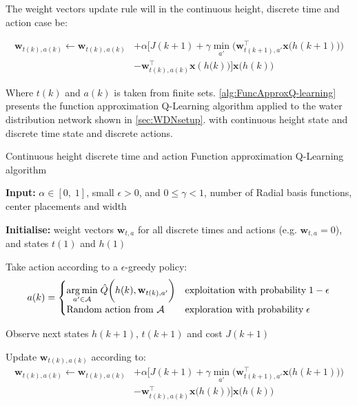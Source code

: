 The weight vectors update rule will in the continuous height, discrete time and action case be: 

\begin{equation}
	\begin{split}
			\textbf{w}_{t(k),a(k)} \leftarrow \textbf{w}_{t(k),a(k)}
		&+\alpha\bigg[J(k+1)+\gamma\min_{a'}\bigg(\textbf{w}_{t(k+1),a'}^{\intercal}\textbf{x}\bigg(h(k+1)\bigg)\bigg)\\
		&-\textbf{w}_{t(k),a(k)}^{\intercal}\textbf{x}(h\bigg(k)\bigg)
		\bigg]\textbf{x}\bigg(h(k)\bigg)
	\end{split}
\end{equation}

Where $ t(k) $ and $ a(k) $ is taken from finite sets. \cref{alg:FuncApproxQ-learning} presents the function approximation Q-Learning algorithm applied to the water distribution network shown in \cref{sec:WDNsetup}. with continuous height state and discrete time state and discrete actions.

\begin{algorithm}
	\caption{Continuous height discrete time and action Function approximation Q-Learning algorithm}
	\label{alg:FuncApproxQ-learning}
	\begin{algorithmic}[1]
		\State \textbf{Input:} $\alpha\in[0,\;1]$, small $\epsilon>0$, and $0\leq\gamma < 1$, number of Radial basis functions, center placements and width
		
		\State \textbf{Initialise:} weight vectors $ \textbf{w}_{t,a} $ for all discrete times and actions (e.g. $ \textbf{w}_{t,a}=0 $), and states $ t(1) $ and $ h(1) $ 
		

	\State Take action according to a $\epsilon$-greedy policy:
	\begin{equation*}
		a(k) = \begin{cases} 
			\underset{a'\in \mathcal{A}}{\arg\min} \; \hat{Q}\bigg(h(k),\textbf{w}_{t(k),a'}\bigg) & \text{exploitation with probability} \; 1-\epsilon  \\
			\text{Random action from $ \mathcal{A} $} & \text{exploration with probability} \; \epsilon 
		\end{cases}
	\end{equation*}

\State Observe next states $ h(k+1) $, $ t(k+1) $ and cost $ J(k+1) $

\State Update $ \textbf{w}_{t(k),a(k)} $ according to:
	\begin{equation*}
	\begin{split}
		\textbf{w}_{t(k),a(k)} \leftarrow \textbf{w}_{t(k),a(k)}
		&+\alpha\bigg[J(k+1)+\gamma\min_{a'}\bigg(\textbf{w}_{t(k+1),a'}^{\intercal}\textbf{x}\bigg(h(k+1)\bigg)\bigg)\\
		&-\textbf{w}_{t(k),a(k)}^{\intercal}\textbf{x}\bigg(h(k)\bigg)
		\bigg]\textbf{x}\bigg(h(k)\bigg)
	\end{split}
\end{equation*}
		\EndFor
	\end{algorithmic}
\end{algorithm}

